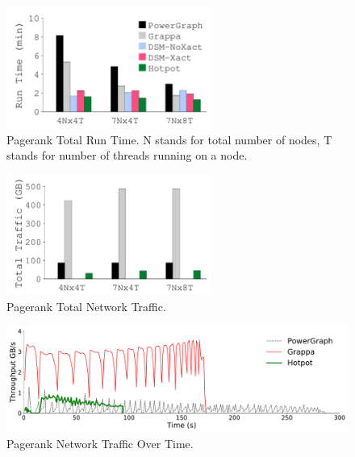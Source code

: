 {
\begin{figure}[th]
\begin{center}
\centerline{\includegraphics[width=0.6\textwidth]{hotpot/Figures/g_plot_graph_ATC_runtime.pdf}}
\caption[Pagerank Total Run Time.]
{
Pagerank Total Run Time.
N stands for total number of nodes, T stands for number of threads running on a node.
}
\label{fig-graph-runtime}
\end{center}
\end{figure}
}
{
\begin{figure}[th]
\begin{center}
\centerline{\includegraphics[width=0.6\textwidth]{hotpot/Figures/g_plot_graph_ATC_network.pdf}}
\caption[Pagerank Total Network Traffic.]
{
Pagerank Total Network Traffic.
}
\label{fig-graph-traffic}
\end{center}
\end{figure}
}
{
\begin{figure}[th]
\begin{center}
\centerline{\includegraphics[width=\textwidth]{hotpot/Figures/g_plot_combined_trace_timewindow.pdf}}
\caption[Pagerank Network Traffic Over Time.]{Pagerank Network Traffic Over Time.}
\label{fig-graph-timeline}
\end{center}
\end{figure}
}
